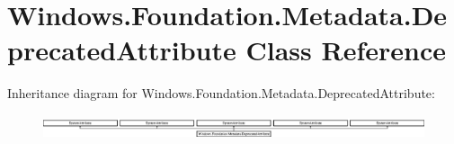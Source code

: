 \hypertarget{class_windows_1_1_foundation_1_1_metadata_1_1_deprecated_attribute}{}\section{Windows.\+Foundation.\+Metadata.\+Deprecated\+Attribute Class Reference}
\label{class_windows_1_1_foundation_1_1_metadata_1_1_deprecated_attribute}
Inheritance diagram for Windows.\+Foundation.\+Metadata.\+Deprecated\+Attribute\+:\begin{figure}[H]
\begin{center}
\leavevmode
\includegraphics[height=0.722581cm]{class_windows_1_1_foundation_1_1_metadata_1_1_deprecated_attribute}
\end{center}
\end{figure}
